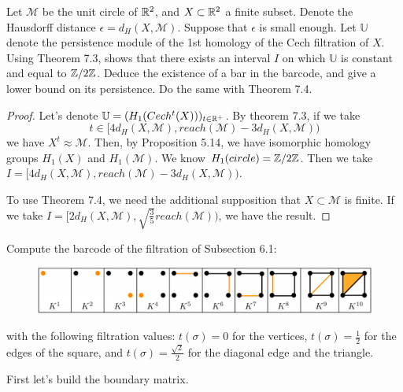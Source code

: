 \noindent\linia

\begin{exercise}
    Let $\mathcal{M}$ be the unit circle of $\mathbb{R}^2$, and $X \subset \mathbb{R}^2$ a
    finite subset. Denote the Hausdorff distance $\epsilon =
    d_H(X,\mathcal{M})$. Suppose that $\epsilon$ is small enough. Let
    $\mathbb{U}$ denote the persistence module of the 1st homology of the Cech
    filtration of $X$. Using Theorem 7.3, shows that there exists an interval
    $I$ on which $\mathbb{U}$ is constant and equal to $\mathbb{Z}/2\mathbb{Z}$. Deduce the existence of a bar in the barcode, and give a lower bound on its persistence. Do the
    same with Theorem 7.4.
\end{exercise}

\begin{proof}
    Let's denote $\mathbb{U} = (H_1(Cech^t(X)))_{t \in \mathbb{R}^+}$. 
    By theorem 7.3, 
    if we take $$t \in [4d_H(X,\mathcal{M}),reach(\mathcal{M}) -
    3d_H(X,\mathcal{M}))$$ we have $X^t \approx \mathcal{M}$. Then, by
    Proposition 5.14, we have isomorphic homology groups $H_1(X)$ and
    $H_1(\mathcal{M})$. We know $H_1(circle) = \mathbb{Z}/2\mathbb{Z}$. Then we take $I = [4d_H(X,\mathcal{M}),reach(\mathcal{M}) -
    3d_H(X,\mathcal{M}))$.

    To use Theorem 7.4, we need the additional supposition that $X \subset
    \mathcal{M}$ is finite. If we take  $I=[2d_H(X,\mathcal{M}),
    \sqrt{\frac{3}{5}}reach(\mathcal{M}))$, we have the result.
\end{proof}

\noindent\linia

\begin{exercise}
    Compute the barcode of the filtration of Subsection 6.1: 
    
    \begin{figure}[H]
        \includegraphics[width=\textwidth]{../images/exercise-52.png}        
    \end{figure}
    \noindent with the
    following filtration values: $t(\sigma) = 0$ for the vertices, $t(\sigma)
    = \frac{1}{2}$ for the edges of the square, and $t(\sigma) =
    \frac{\sqrt{2}}{2}$ for the diagonal edge and the triangle.
\end{exercise}

First let's build the boundary matrix. 

